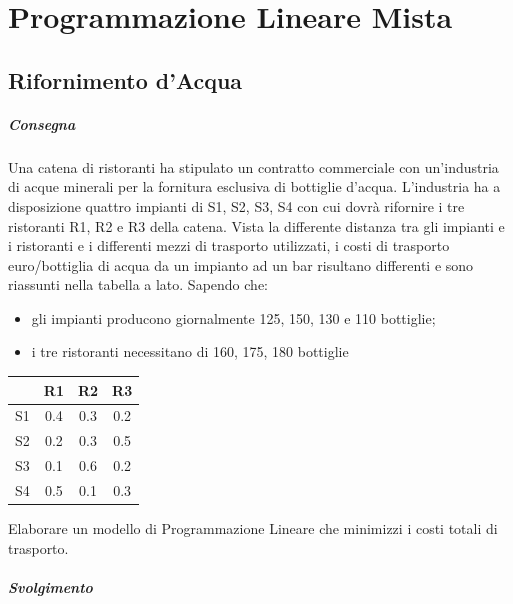 \chapter{Programmazione Lineare Mista}

\section{Rifornimento d'Acqua}

\paragraph{Consegna}

Una catena di ristoranti ha stipulato un contratto commerciale con un'industria di acque minerali per la fornitura esclusiva di bottiglie d’acqua. L'industria ha a disposizione quattro impianti di S1, S2, S3, S4 con cui dovrà rifornire i tre ristoranti R1, R2 e R3 della catena. Vista la differente distanza tra gli impianti e i ristoranti e i differenti mezzi di trasporto utilizzati, i costi di trasporto euro/bottiglia di acqua da un impianto ad un bar risultano differenti e sono riassunti nella tabella a lato. Sapendo che:

\begin{itemize}
    \item gli impianti producono giornalmente 125, 150, 130 e 110 bottiglie;
    \item i tre ristoranti necessitano di 160, 175, 180 bottiglie
\end{itemize}

\begin{center}
    \begin{tabular}{||c | c | c | c||}
        \hline
        & R1 & R2 & R3 \\
        \hline
        S1 & 0.4 & 0.3 & 0.2 \\
        \hline
        S2 & 0.2 & 0.3 & 0.5 \\
        \hline
        S3 & 0.1 & 0.6 & 0.2 \\
        \hline
        S4 & 0.5 & 0.1 & 0.3 \\
        \hline
    \end{tabular}
\end{center}

Elaborare un modello di Programmazione Lineare che minimizzi i costi totali di trasporto.

\paragraph{Svolgimento}

